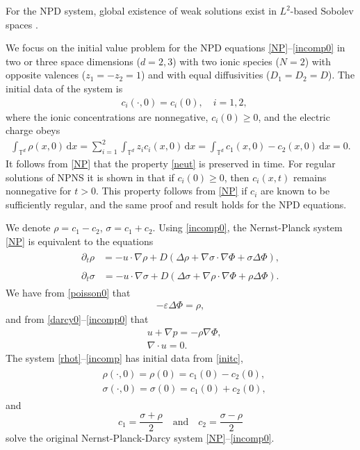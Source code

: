 \documentclass[10pt,twoside,reqno]{amsart}
\numberwithin{figure}{section}
\numberwithin{equation}{section}
\theoremstyle{definition}
\newcommand{\1}{\mathbbm{1}}
\newcommand{\diff}{\,\mathrm{d}}
\newcommand{\pt}{\partial_t}
\newcommand{\T}{\mathbb{T}}
\newcommand{\ve}{\varepsilon}
\begin{document}
For the NPD system, global existence of weak solutions exist in $L^2$-based Sobolev spaces \cite{HK16pa, HK16pb, HRK12}.

We focus on the initial value problem for the NPD equations \eqref{NP}--\eqref{incomp0} in two or three space dimensions ($d = 2, 3$) with two ionic species ($N = 2$) with opposite valences ($z_1 = - z_2 = 1$) and with equal diffusivities ($D_1 = D_2 = D$). The initial data of the system is
\begin{align}
\label{initc}
& c_i(\cdot , 0) = c_i(0), \quad i = 1, 2,
\end{align}
where the ionic concentrations are nonnegative, $c_i(0) \geq 0$, and the electric charge obeys
\begin{align}
\label{neut}
\int_{\T^d} \rho(x, 0) \diff{x} = \sum_{i = 1}^2 \int_{\T^d} z_i c_i(x, 0) \diff{x} = \int_{\T^d} c_1(x, 0) - c_2(x, 0) \diff{x} = 0.
\end{align}
It follows from \eqref{NP} that the property \eqref{neut} is preserved in time.
For regular solutions of NPNS it is shown in \cite{CI19, CIL20pb} that if $c_i(0) \geq 0$, then $c_i(x, t)$ remains nonnegative for $t > 0$. This property follows from \eqref{NP} if $c_i$ are known to be sufficiently regular, and the same proof and result holds for the NPD equations.

We denote $\rho = c_1 - c_2$, $\sigma = c_1 + c_2$.  Using \eqref{incomp0}, the Nernst-Planck system \eqref{NP} is equivalent to the equations
\begin{align}
\begin{split}
\pt \rho & = - u \cdot \nabla \rho + D (\Delta \rho + \nabla \sigma \cdot \nabla \Phi + \sigma \Delta \Phi),
\end{split} \label{rhot}\\
\begin{split}
\pt \sigma & = - u \cdot \nabla \sigma + D (\Delta \sigma + \nabla \rho \cdot \nabla \Phi + \rho \Delta \Phi).
\end{split} \label{sigmat0}
\end{align}
We have from \eqref{poisson0} that
\begin{align}
\label{poisson}
- \ve \Delta \Phi = \rho,
\end{align}
and from \eqref{darcy0}--\eqref{incomp0} that
\begin{align}
& u + \nabla p = - \rho \nabla \Phi, \label{darcy}\\
& \nabla \cdot u = 0. \label{incomp}
\end{align}
The system \eqref{rhot}--\eqref{incomp} has initial data from \eqref{initc},
\begin{align}
\label{initial}
\begin{split}
& \rho(\cdot, 0) = \rho(0) = c_1(0) - c_2(0),\\
& \sigma (\cdot, 0) = \sigma(0) = c_1(0) + c_2(0),
\end{split}
\end{align}
and
\[
c_1 = \frac{\sigma + \rho}{2} \quad \text{and} \quad c_2 = \frac{\sigma - \rho}{2}
\]
solve the original Nernst-Planck-Darcy system \eqref{NP}--\eqref{incomp0}.
\end{document}
